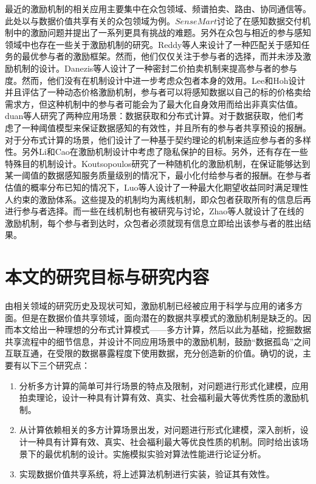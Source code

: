 \documentclass[promaster]{thesis-uestc}
\begin{document}
最近的激励机制的相关应用主要集中在众包领域、频谱拍卖\cite{gao2010map}\cite{wang2011district}\cite{yang2014promise}\cite{zhou2008ebay}、路由\cite{zhong2007designing}、协同通信\cite{chen2010conflicts}\cite{yang2011truthful}等。此处以与数据价值共享有关的众包领域为例。$SenseMart$\cite{chou2007sensing}讨论了在感知数据交付机制中的激励问题并提出了一系列更具有挑战的难题。另外在众包与相近的参与感知领域中也存在一些关于激励机制的研究。Reddy等人来设计了一种匹配关于感知任务的最优参与者的激励框架。然而，他们仅仅关注于参与者的选择，而并未涉及激励机制的设计。Danezis等人设计了一种密封二价拍卖机制来提高参与者的参与度。然而，他们没有在机制设计中进一步考虑众包者本身的效用。Lee和Hoh设计并且评估了一种动态价格激励机制，参与者可以将感知数据以自己的标的价格卖给需求方，但这种机制中的参与者可能会为了最大化自身效用而给出非真实估值。duan等人研究了两种应用场景：数据获取和分布式计算。对于数据获取，他们考虑了一种阈值模型来保证数据感知的有效性，并且所有的参与者共享预设的报酬。对于分布式计算的场景，他们设计了一种基于契约理论的机制来适应参与者的多样性。另外Li和Cao在激励机制设计中考虑了隐私保护的目标。另外，还有存在一些特殊目的机制设计。Koutsopoulos研究了一种随机化的激励机制，在保证能够达到某一阈值的数据感知服务质量级别的情况下，最小化付给参与者的报酬。在参与者估值的概率分布已知的情况下，Luo等人设计了一种最大化期望收益同时满足理性人约束的激励体系。这些提及的机制均为离线机制，即众包者获取所有的信息后再进行参与者选择。而一些在线机制也有被研究与讨论，Zhao等人就设计了在线的激励机制，每个参与者到达时，众包者必须就现有信息立即给出该参与者的胜出结果。



\section{本文的研究目标与研究内容}
由相关领域的研究历史及现状可知，激励机制已经被应用于科学与应用的诸多方面。但是在数据价值共享领域，面向潜在的数据共享模式的激励机制是缺乏的。因而本文给出一种理想的分布式计算模式——多方计算，然后以此为基础，挖掘数据共享流程中的细节信息，并设计不同应用场景中的激励机制，鼓励“数据孤岛”之间互联互通，在受限的数据暴露程度下使用数据，充分创造新的价值。确切的说，主要有以下三个研究点：
\begin{enumerate}
    \item 分析多方计算的简单可并行场景的特点及限制，对问题进行形式化建模，应用拍卖理论，设计一种具有计算有效、真实、社会福利最大等优秀性质的激励机制。
    \item 从计算依赖相关的多方计算场景出发，对问题进行形式化建模，深入剖析，设计一种具有计算有效、真实、社会福利最大等优良性质的机制。同时给出该场景下的最优机制的设计。实施模拟实验对算法性能进行论证分析。
    \item 实现数据价值共享系统，将上述算法机制进行实装，验证其有效性。
\end{enumerate}
\end{document}
